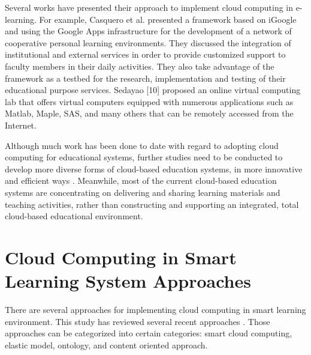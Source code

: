 \documentclass[journal]{vgtc}                %
\begin{document}
  Several works have presented their approach to implement cloud computing in e-learning. For example, Casquero et al. \cite{casquero2008igoogle} presented a framework based on iGoogle and using the Google Apps infrastructure for the development of a network of cooperative personal learning environments. They discussed the integration of institutional and external services in order to provide customized support to faculty members in their daily activities. They also take advantage of the framework as a testbed for the research, implementation and testing of their educational purpose services. Sedayao [10] proposed an online virtual computing lab that offers virtual computers equipped with numerous applications such as Matlab, Maple, SAS, and many others that can be remotely accessed from the Internet.

  Although much work has been done to date with regard to adopting cloud computing for educational systems, further studies need to be conducted to develop more diverse forms of cloud-based education systems, in more innovative and efficient ways \cite{jeong2013content}. Meanwhile, most of the current cloud-based education systems are concentrating on delivering and sharing learning materials and teaching activities, rather than constructing and supporting an integrated, total cloud-based educational environment.

\section{Cloud Computing in Smart Learning System Approaches}
There are several approaches for implementing cloud computing in smart learning environment. This study has reviewed several recent approaches \cite{Kim2013,s110807835,jeong2013content,jeong2013cloud,nasr2012proposed}. Those approaches can be categorized into certain categories: smart cloud computing, elastic model, ontology, and content oriented approach.

\end{document}
